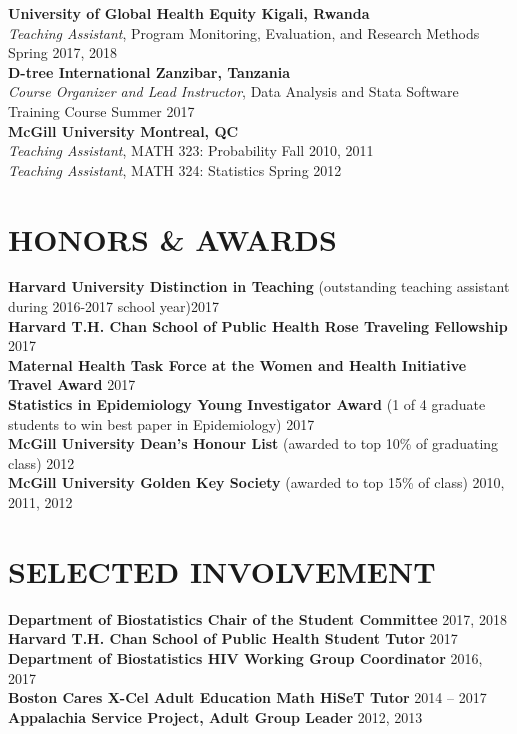 \documentclass[12pt]{article}
\begin{document}
\textbf{University of Global Health Equity \hfill \hfill Kigali, Rwanda} \\
\textit{Teaching Assistant}, Program Monitoring, Evaluation, and Research Methods  \hfill \hfill Spring 2017, 2018 \\

\textbf{D-tree International \hfill \hfill Zanzibar, Tanzania}\\
\textit{Course Organizer and Lead Instructor}, Data Analysis and Stata Software Training Course \hfill \hfill Summer 2017  \\

\textbf{McGill University \hfill \hfill Montreal, QC}\\
\textit{Teaching Assistant}, MATH 323: Probability \hfill \hfill Fall 2010, 2011 \\
\textit{Teaching Assistant}, MATH 324: Statistics \hfill \hfill Spring 2012 

\section*{\textbf{{\Large H}{\small ONORS} {\Large \&} {\Large A}{\small WARDS}}}

\textbf{Harvard University Distinction in Teaching} {\footnotesize (outstanding teaching assistant during 2016-2017 school year)}\hfill \hfill	2017 \\
\textbf{Harvard T.H. Chan School of Public Health Rose Traveling Fellowship} \hfill \hfill	2017 \\
\textbf{Maternal Health Task Force at the Women and Health Initiative Travel Award} \hfill \hfill	2017 \\
\textbf{Statistics in Epidemiology Young Investigator Award} {\footnotesize (1 of 4 graduate students to win best paper in Epidemiology)}  \hfill \hfill	2017 \\
\textbf{McGill University Dean's Honour List} {\footnotesize (awarded to top 10\% of graduating class)}  \hfill \hfill	2012 \\
\textbf{McGill University Golden Key Society} {\footnotesize (awarded to top 15\% of class)}  \hfill \hfill2010, 2011, 2012 

\section*{\textbf{{\Large S}{\small ELECTED} {\Large I}{\small NVOLVEMENT}}}
\textbf{Department of Biostatistics Chair of the Student Committee} \hfill \hfill 2017, 2018 \\
\textbf{Harvard T.H. Chan School of Public Health Student Tutor} \hfill \hfill 2017 \\
\textbf{Department of Biostatistics HIV Working Group Coordinator} \hfill \hfill 2016, 2017 \\
\textbf{Boston Cares X-Cel Adult Education Math HiSeT Tutor} \hfill \hfill 2014 -- 2017 \\
\textbf{Appalachia Service Project, Adult Group Leader} \hfill \hfill 2012, 2013
\end{document}
